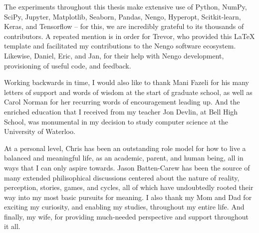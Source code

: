 \newpage

The experiments throughout this thesis make extensive use of Python, NumPy, SciPy, Jupyter, Matplotlib, Seaborn, Pandas, Nengo, Hyperopt, Scitkit-learn, Keras, and Tensorflow -- for this, we are incredibly grateful to its thousands of contributors.
A repeated mention is in order for Trevor, who provided this \LaTeX{} template and facilitated my contributions to the Nengo software ecosystem.
Likewise, Daniel, Eric, and Jan, for their help with Nengo development, provisioning of useful code, and feedback.

Working backwards in time, I would also like to thank Mani Fazeli for his many letters of support and words of wisdom at the start of graduate school, as well as Carol Norman for her recurring words of encouragement leading up.
And the enriched education that I received from my teacher Jon Devlin, at Bell High School, was monumental in my decision to study computer science at the University of Waterloo.

At a personal level, Chris has been an outstanding role model for how to live a balanced and meaningful life, as an academic, parent, and human being, all in ways that I can only aspire towards.
Jason Batten-Carew has been the source of many extended philisophical discussions centered about the nature of reality, perception, stories, games, and cycles, all of which have undoubtedly rooted their way into my most basic pursuits for meaning.
I also thank my Mom and Dad for exciting my curiosity, and enabling my studies, throughout my entire life.
And finally, my wife, for providing much-needed perspective and support throughout it all.

\cleardoublepage
